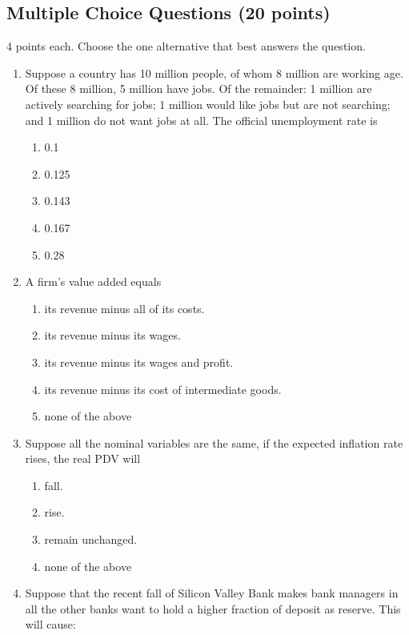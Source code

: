 \documentclass[12pt]{article}
\begin{document}
\subsection*{Multiple Choice Questions (20 points)}
4 points each. Choose the one alternative that best answers the question.
\begin{enumerate}[label=\arabic*.]
    \item  Suppose a country has 10 million people, of whom 8 million are working age. Of these 8 million, 5 million have jobs. Of the remainder: 1 million are actively searching for jobs; 1 million would like jobs but are not searching; and 1 million do not want jobs at all. The official unemployment rate is
    \begin{enumerate}[label=\Alph*.]
        \item 0.1
        \item 0.125
        \item 0.143
        \item 0.167
        \item 0.28
    \end{enumerate}
    \item A firm's value added equals
    \begin{enumerate}[label=\Alph*.]
        \item its revenue minus all of its costs.
        \item its revenue minus its wages.
        \item its revenue minus its wages and profit.
        \item its revenue minus its cost of intermediate goods.
        \item none of the above
    \end{enumerate}
    \item Suppose all the nominal variables are the same, if the expected inflation rate rises, the real PDV will
    \begin{enumerate}[label=\Alph*.]
        \item fall.
        \item rise.
        \item remain unchanged.
        \item none of the above
    \end{enumerate}
    \item Suppose that the recent fall of Silicon Valley Bank makes bank managers in all the other banks want to hold a higher fraction of deposit as reserve. This will cause:
    \begin{enumerate}[label=\Alph*.]

\end{enumerate}
\end{enumerate}
\end{document}
